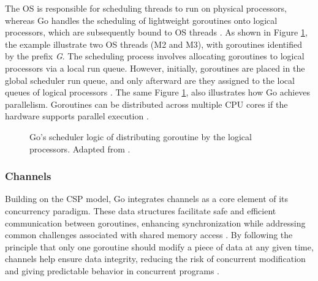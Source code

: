 The \gls{OS} is responsible for scheduling threads to run on physical processors, whereas Go handles the scheduling of lightweight goroutines onto logical processors, which are subsequently bound to \gls{OS} threads \cite{Kennedy2016}. As shown in Figure \ref{fig:gorutine-threads-relation}, the example illustrate two \gls{OS} threads (M2 and M3), with goroutines identified by the prefix \textit{G}. The scheduling process involves allocating goroutines to logical processors via a local run queue. However, initially, goroutines are placed in the global scheduler run queue, and only afterward are they assigned to the local queues of logical processors \cite{Kennedy2016,Cox-Buday2017}. The same Figure \ref{fig:gorutine-threads-relation}, also illustrates how Go achieves parallelism. Goroutines can be distributed across multiple CPU cores if the hardware supports parallel execution \cite{Kennedy2016}.

\begin{figure}
    \centering
    \caption[Go’s scheduler logic of distributing goroutine by the logical processors]{Go’s scheduler logic of distributing goroutine by the logical processors. Adapted from \cite{Kennedy2016}.}
    \label{fig:gorutine-threads-relation}
\end{figure}

\subsubsection{Channels}

Building on the \gls{CSP} model, Go integrates channels as a core element of its concurrency paradigm. These data structures facilitate safe and efficient communication between goroutines, enhancing synchronization while addressing common challenges associated with shared memory access \cite{Kennedy2016}. By following the principle that only one goroutine should modify a piece of data at any given time, channels help ensure data integrity, reducing the risk of concurrent modification and giving predictable behavior in concurrent programs \cite{Cox-Buday2017}.

